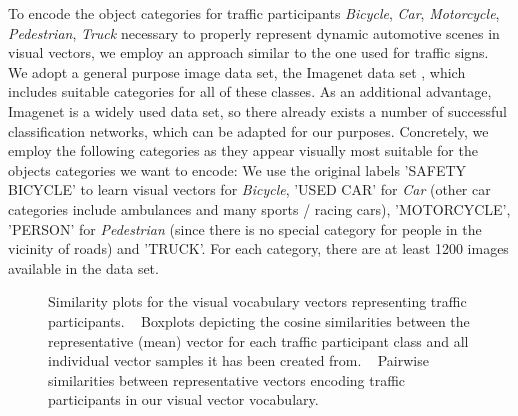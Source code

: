 To encode the object categories for traffic participants \emph{Bicycle}, \emph{Car}, \emph{Motorcycle}, \emph{Pedestrian}, \emph{Truck} necessary to properly represent dynamic automotive scenes in visual vectors, we employ an approach similar to the one used for traffic signs.
We adopt a general purpose image data set, the Imagenet data set \cite{Deng2009}, which includes suitable categories for all of these classes.
As an additional advantage, Imagenet is a widely used data set, so there already exists a number of successful classification networks, which can be adapted for our purposes.
Concretely, we employ the following categories as they appear visually most suitable for the objects categories we want to encode:
We use the original labels 'SAFETY BICYCLE' to learn visual vectors for \emph{Bicycle}, 'USED CAR' for \emph{Car} (other car categories include ambulances and many sports / racing cars), 'MOTORCYCLE', 'PERSON' for \emph{Pedestrian} (since there is no special category for people in the vicinity of roads) and 'TRUCK'.
For each category, there are at least \num{1200} images available in the data set.

\begin{figure}[t]
    \centering
    \caption{Similarity plots for the visual vocabulary vectors representing traffic participants. ~\protect{} Boxplots depicting the cosine similarities between the representative (mean) vector for each traffic participant class and all individual vector samples it has been created from. ~\protect{} Pairwise similarities between representative
    vectors encoding traffic participants in our visual vector vocabulary.}
    \label{fig:visual_vocab_traffic_participants}
\end{figure}

